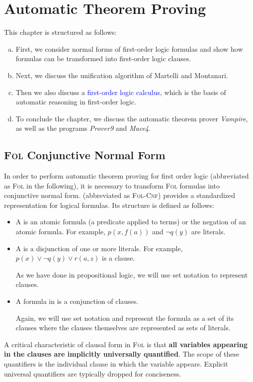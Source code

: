 \chapter{Automatic Theorem Proving}
This chapter is structured as follows:
\begin{enumerate}[(a)]
\item First, we consider normal forms of first-order logic formulas and show how formulas
      can be transformed into first-order logic clauses.
\item Next, we discuss the unification algorithm of Martelli and Montanari.
\item Then we also discuss a \textcolor{blue}{first-order logic calculus}, which is the basis
      of automatic reasoning in first-order logic.
\item To conclude the chapter, we discuss the automatic theorem prover \textsl{Vampire}, as well as
      the programs \textsl{Prover9} and \textsl{Mace4}.
\end{enumerate}

\section{\textsc{Fol} Conjunctive Normal Form}
In order to perform automatic theorem proving for first order logic (abbreviated as \textsc{Fol} in the
following), it is necessary to transform \textsc{Fol} formulas into conjunctive normal form.
 (abbreviated as \textsc{Fol-Cnf}) provides a standardized
representation for logical formulas. Its structure is defined as follows: 
\begin{itemize}
\item A  is an atomic formula (a predicate applied to terms) or the negation of an
      atomic formula. For example, $p(x, f(a))$ and $\neg q(y)$ are literals. 
\item A  is a disjunction of one or more literals. For example,
      $p(x) \lor \neg q(y) \lor r(a,z)$ is a clause.

      As we have done in propositional logic, we will use set notation to represent clauses.
\item A formula in  is a conjunction of clauses.

      Again, we will use set notation and represent the formula as a set of its clauses
      where the clauses themselves are represented as sets of literals.
\end{itemize}
A critical characteristic of clausal form in \textsc{Fol} is that \textbf{all variables appearing in the clauses are implicitly universally quantified}. The scope of these quantifiers is the individual clause in which the variable appears. Explicit universal quantifiers are typically dropped for conciseness.

